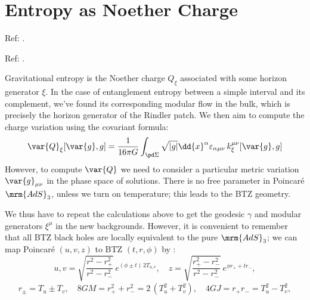 \documentclass[a4paper
	,10pt
]{article}
\begin{document}
\section{Entropy as Noether Charge}
	Ref: \textcite{Wald:1993nt,Iyer:1994ys,Iyer:1995kg}.
	 
	Ref: \textcite{Lewkowycz:2013nqa,Faulkner:2013ana}. 
	
	Gravitational entropy is the Noether charge $Q_\xi$ associated with some horizon generator $\xi$. In the case of entanglement entropy between a simple interval and its complement, we've found its corresponding modular flow in the bulk, which is precisely the horizon generator of the Rindler patch. We then aim to compute the charge variation using the covariant formula:
	\begin{equation}
		\var{Q}_{\xi} [\var{g}, g]
		= \frac{1}{16 \pi G}
			\int_{\pd\Sigma}
			\sqrt{|g|} \dd{x}^{\alpha}
				\varepsilon_{\alpha\mu\nu}\,
				k_\xi^{\mu\nu} [\var{g}, g]
	\end{equation}
	However, to compute $\var{Q}$ we need to consider a particular metric variation $\var{g}_{\mu\nu}$ in the phase space of solutions. There is no free parameter in Poincar\'e $\mrm{AdS}_3$, unless we turn on temperature; this leads to the BTZ geometry. 
	
	We thus have to repeat the calculations above to get the geodesic $\gamma$ and modular generators $\xi^\mu$ in the new backgrounds. However, it is convenient to remember that all BTZ black holes are locally equivalent to the pure $\mrm{AdS}_3$; we can map Poincar\'e $(u,v,z)$ to BTZ $(t,r,\phi)$ by \cite{Hubeny:2007xt}:
	\begin{equation}
		u,v = \sqrt{\frac{r^2 - r_+^2}{r^2 - r_-^2}}\,
			e^{(\phi\pm t)\,2T_{u,v}},
	\quad
		z = \sqrt{\frac{r_+^2 - r_-^2}{r^2 - r_-^2}}\,
			e^{\phi r_+ + t r_-},
	\end{equation}
	\begin{gather}
		r_\pm = T_u \pm T_v,
	\quad
		8GM = r_+^2 + r_-^2
		= 2\,(T_u^2 + T_v^2),
	\quad
		4GJ = r_+ r_-
		= T_u^2 - T_v^2,
	\end{gather}
	

\vspace{1.2\baselineskip}
\raggedright
\printbibliography[%
	,heading = bibintoc
]
\end{document}
